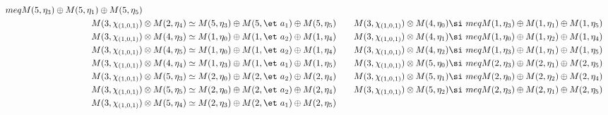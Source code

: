 \begin{align*}
meq M(5,\eta_{3}) \oplus M(5,\eta_{1}) \oplus M(5,\eta_{5})\\
M(3,\chi_{(1,0,1)}) &\otimes M(2,\eta_{4}) \simeq M(5,\eta_{3}) \oplus M(5,\et\
a_{1}) \oplus M(5,\eta_{5}) &&& M(3,\chi_{(1,0,1)}) &\otimes M(4,\eta_{0}) \si\
meq M(1,\eta_{3}) \oplus M(1,\eta_{1}) \oplus M(1,\eta_{5})\\
M(3,\chi_{(1,0,1)}) &\otimes M(4,\eta_{3}) \simeq M(1,\eta_{0}) \oplus M(1,\et\
a_{2}) \oplus M(1,\eta_{4}) &&& M(3,\chi_{(1,0,1)}) &\otimes M(4,\eta_{1}) \si\
meq M(1,\eta_{0}) \oplus M(1,\eta_{2}) \oplus M(1,\eta_{4})\\
M(3,\chi_{(1,0,1)}) &\otimes M(4,\eta_{5}) \simeq M(1,\eta_{0}) \oplus M(1,\et\
a_{2}) \oplus M(1,\eta_{4}) &&& M(3,\chi_{(1,0,1)}) &\otimes M(4,\eta_{2}) \si\
meq M(1,\eta_{3}) \oplus M(1,\eta_{1}) \oplus M(1,\eta_{5})\\
M(3,\chi_{(1,0,1)}) &\otimes M(4,\eta_{4}) \simeq M(1,\eta_{3}) \oplus M(1,\et\
a_{1}) \oplus M(1,\eta_{5}) &&& M(3,\chi_{(1,0,1)}) &\otimes M(5,\eta_{0}) \si\
meq M(2,\eta_{3}) \oplus M(2,\eta_{1}) \oplus M(2,\eta_{5})\\
M(3,\chi_{(1,0,1)}) &\otimes M(5,\eta_{3}) \simeq M(2,\eta_{0}) \oplus M(2,\et\
a_{2}) \oplus M(2,\eta_{4}) &&& M(3,\chi_{(1,0,1)}) &\otimes M(5,\eta_{1}) \si\
meq M(2,\eta_{0}) \oplus M(2,\eta_{2}) \oplus M(2,\eta_{4})\\
M(3,\chi_{(1,0,1)}) &\otimes M(5,\eta_{5}) \simeq M(2,\eta_{0}) \oplus M(2,\et\
a_{2}) \oplus M(2,\eta_{4}) &&& M(3,\chi_{(1,0,1)}) &\otimes M(5,\eta_{2}) \si\
meq M(2,\eta_{3}) \oplus M(2,\eta_{1}) \oplus M(2,\eta_{5})\\
M(3,\chi_{(1,0,1)}) &\otimes M(5,\eta_{4}) \simeq M(2,\eta_{3}) \oplus M(2,\et\
a_{1}) \oplus M(2,\eta_{5})\\
\end{align*}

